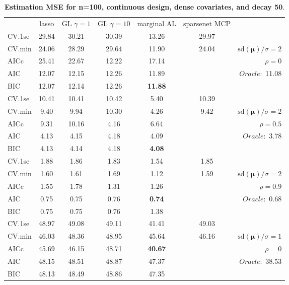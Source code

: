\begin{table}\vspace{-.5cm}
\caption[l]{ { \bf Estimation MSE for n=100, continuous design, 
dense covariates, and  decay  50}.}
\vspace{-.5cm}
\footnotesize{}
\begin{center}
\begin{tabular}{l*{5}{c}|r}
& lasso & GL $\gamma=1$ & GL $\gamma=10$ & marginal AL & sparsenet MCP  & \\
 \cline{1-7}
CV.1se & 29.84 & 30.21 & 30.39 & 13.26 & 29.97 & \\
CV.min & 24.06 & 28.29 & 29.64 & 11.90 & 24.04 &  $\mathrm{sd}(\mathbf{\mu})/\sigma=2$ \\
AICc & 25.41 & 22.67 & 12.22 & 17.14 & & $\rho=0$ \\
AIC & 12.07 & 12.15 & 12.26 & 11.89 & &  \multirow{2}{*}{$Oracle: $ 11.08} \\
BIC & 12.07 & 12.14 & 12.26 & {\bf 11.88} & &  \\
 \hline 
CV.1se & 10.41 & 10.41 & 10.42 & 5.40 & 10.39 & \\
CV.min & 9.40 & 9.94 & 10.30 & 4.26 & 9.42 &  $\mathrm{sd}(\mathbf{\mu})/\sigma=2$ \\
AICc & 9.31 & 10.16 & 4.16 & 6.64 & & $\rho=0.5$ \\
AIC & 4.13 & 4.15 & 4.18 & 4.09 & &  \multirow{2}{*}{$Oracle: $ 3.78} \\
BIC & 4.13 & 4.14 & 4.18 & {\bf 4.08} & &  \\
 \hline 
CV.1se & 1.88 & 1.86 & 1.83 & 1.54 & 1.85 & \\
CV.min & 1.60 & 1.61 & 1.69 & 1.12 & 1.59 &  $\mathrm{sd}(\mathbf{\mu})/\sigma=2$ \\
AICc & 1.55 & 1.78 & 1.31 & 1.26 & & $\rho=0.9$ \\
AIC & 0.75 & 0.75 & 0.76 & {\bf 0.74} & &  \multirow{2}{*}{$Oracle: $ 0.68} \\
BIC & 0.75 & 0.75 & 0.76 & 1.38 & &  \\
 \hline 
CV.1se & 48.97 & 49.08 & 49.11 & 41.41 & 49.03 & \\
CV.min & 46.03 & 48.36 & 48.95 & 45.64 & 46.16 &  $\mathrm{sd}(\mathbf{\mu})/\sigma=1$ \\
AICc & 45.69 & 46.15 & 48.71 & {\bf 40.67} & & $\rho=0$ \\
AIC & 48.15 & 48.51 & 48.87 & 47.37 & &  \multirow{2}{*}{$Oracle: $ 38.53} \\
BIC & 48.13 & 48.49 & 48.86 & 47.35 & &  \\

\end{tabular}
\end{center}
\end{table}
